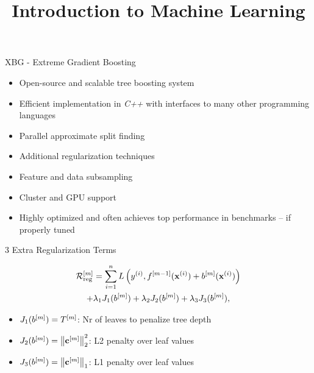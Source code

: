 \documentclass[11pt,compress,t,notes=noshow, xcolor=table]{beamer}
\title{Introduction to Machine Learning}
\date{}
\begin{document}


\begin{vbframe}{XBG - Extreme Gradient Boosting}



  \begin{itemize}
    \item Open-source and scalable tree boosting system
    \item Efficient implementation in \emph{C++} with interfaces to many other programming languages
    \item Parallel approximate split finding
    \item Additional regularization techniques
    \item Feature and data subsampling
    \item Cluster and GPU support
    \item Highly optimized and often achieves top performance in benchmarks 
        -- if properly tuned
  \end{itemize}

\end{vbframe}

\begin{frame}{3 Extra Regularization Terms}


  \begin{multline*}
    \mathcal{R}_{\text{reg}}^{[m]} = \sum_{i=1}^{n} L\left(y^{(i)}, f^{[m-1]}(\mathbf{x}^{(i)}) + b^{[m]}(\mathbf{x}^{(i)})\right)\\
    + \lambda_1 J_1(b^{[m]}) + \lambda_2 J_2(b^{[m]}) + \lambda_3 J_3(b^{[m]}),
  \end{multline*}

  \lz
  \begin{itemize}
    \item $J_1(b^{[m]}) = T^{[m]}$:  Nr of leaves to penalize tree depth
    \item $J_2(b^{[m]}) = \left\|\mathbf{c}^{[m]}\right\|^2_2$:  L2 penalty over leaf values 
    \item $J_3(b^{[m]}) = \left\|\mathbf{c}^{[m]}\right\|_1$: L1 penalty over leaf values 
  \end{itemize}
\end{frame}
\end{document}
